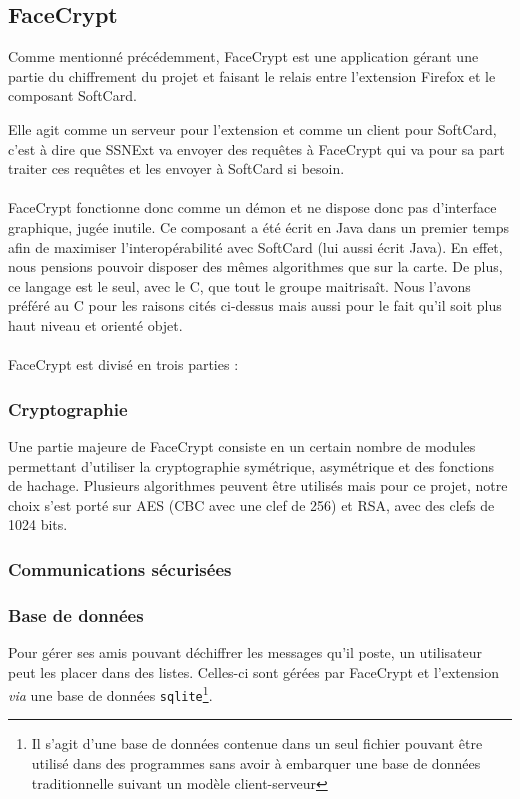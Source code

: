 \documentclass[a4paper,11pt,french]{article}
\begin{document}
\subsection{FaceCrypt}
Comme mentionné précédemment, FaceCrypt est une application gérant une partie du
chiffrement du projet et faisant le relais entre l'extension Firefox et le 
composant SoftCard. 

Elle agit comme un serveur pour l'extension et comme un client pour SoftCard, 
c'est à dire que SSNExt va envoyer des requêtes à FaceCrypt qui va pour 
sa part traiter ces requêtes et les envoyer à SoftCard si besoin.

\paragraph{}
FaceCrypt fonctionne donc comme un démon et ne dispose donc pas d'interface
graphique, jugée inutile. Ce composant a été écrit en Java dans un premier 
temps afin de maximiser l'interopérabilité avec SoftCard (lui aussi écrit
Java). En effet, nous pensions pouvoir disposer des mêmes algorithmes 
que sur la carte. De plus, ce langage est le seul, avec le C, que tout le
groupe maitrisaît. Nous l'avons préféré au C pour les raisons cités ci-dessus
mais aussi pour le fait qu'il soit plus haut niveau et orienté objet.

\paragraph{}
FaceCrypt est divisé en trois parties : 

\subsubsection{Cryptographie}
Une partie majeure de FaceCrypt consiste en un certain nombre de modules 
permettant d'utiliser la cryptographie symétrique, asymétrique et des 
fonctions de hachage. Plusieurs algorithmes peuvent être utilisés mais
pour ce projet, notre choix s'est porté sur AES (CBC avec une clef de 256) et 
RSA, avec des clefs de 1024 bits.


\subsubsection{Communications sécurisées} %

\subsubsection{Base de données}
Pour gérer ses amis pouvant déchiffrer les messages qu'il poste, un utilisateur
peut les placer dans des listes. Celles-ci sont gérées par FaceCrypt et 
l'extension \emph{via} une base de données \texttt{sqlite}\footnote{Il s'agit
d'une base de données contenue dans un seul fichier pouvant être utilisé dans 
des programmes sans avoir à embarquer une base de données traditionnelle suivant
un modèle client-serveur}. 
\end{document}
